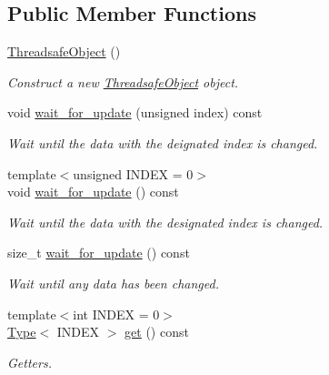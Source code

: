 \subsection*{Public Member Functions}
\begin{DoxyCompactItemize}
\item 
\mbox{\label{classreal__time__tools_1_1ThreadsafeObject_a4b1b5185f60ed5228e307c10639dfe63}} 
\hyperlink{classreal__time__tools_1_1ThreadsafeObject_a4b1b5185f60ed5228e307c10639dfe63}{Threadsafe\+Object} ()
\begin{DoxyCompactList}\small\item\em Construct a new \hyperlink{classreal__time__tools_1_1ThreadsafeObject}{Threadsafe\+Object} object. \end{DoxyCompactList}\item 
void \hyperlink{classreal__time__tools_1_1ThreadsafeObject_a85d7f9175a08a3440f9bb783fd4aa264}{wait\+\_\+for\+\_\+update} (unsigned index) const
\begin{DoxyCompactList}\small\item\em Wait until the data with the deignated index is changed. \end{DoxyCompactList}\item 
{\footnotesize template$<$unsigned I\+N\+D\+EX = 0$>$ }\\void \hyperlink{classreal__time__tools_1_1ThreadsafeObject_a2b1cc6a7d2691e8266130701975fd1f1}{wait\+\_\+for\+\_\+update} () const
\begin{DoxyCompactList}\small\item\em Wait until the data with the designated index is changed. \end{DoxyCompactList}\item 
size\+\_\+t \hyperlink{classreal__time__tools_1_1ThreadsafeObject_a16807abf31871861f2fc3e228ecda18f}{wait\+\_\+for\+\_\+update} () const
\begin{DoxyCompactList}\small\item\em Wait until any data has been changed. \end{DoxyCompactList}\item 
{\footnotesize template$<$int I\+N\+D\+EX = 0$>$ }\\\hyperlink{classreal__time__tools_1_1ThreadsafeObject_afcbd77df1964d4fe606f1e776f1ff9b8}{Type}$<$ I\+N\+D\+EX $>$ \hyperlink{classreal__time__tools_1_1ThreadsafeObject_a1d0b19b1ddbeb9c4c2ea93551ce05841}{get} () const
\begin{DoxyCompactList}\small\item\em Getters. \end{DoxyCompactList}\item 

\end{DoxyCompactItemize}
